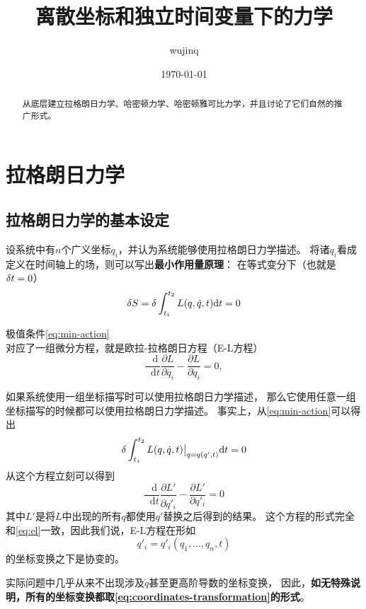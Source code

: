 \documentclass[UTF8, a4paper]{ctexart}
\title{离散坐标和独立时间变量下的力学}
\author{wujinq}
\date{\today}
\newcommand*{\diff}{\mathop{}\!\mathrm{d}}
\begin{document}
\maketitle

\begin{abstract}
    从底层建立拉格朗日力学、哈密顿力学、哈密顿雅可比力学，并且讨论了它们自然的推广形式。
\end{abstract}

\section{拉格朗日力学}

\subsection{拉格朗日力学的基本设定} \label{sec:langrangian-basic}
设系统中有$n$个广义坐标${q_i}$，并认为系统能够使用拉格朗日力学描述。
将诸$q_i$看成定义在时间轴上的场，则可以写出\textbf{最小作用量原理}：
在等式变分下（也就是$\var t=0$）
\begin{equation}
    \var S = \var \int_{t_1}^{t_2} L(q, \dot{q}, t) \mathrm{d} t = 0
    \label{eq:min-action}
\end{equation}

极值条件\eqref{eq:min-action}对应了一组微分方程，就是欧拉-拉格朗日方程（E-L方程）
\begin{equation}
    \frac{\diff}{\diff t} \frac{\partial L}{\partial \dot{q_i}} - \frac{\partial L}{\partial q_i} = 0,
    \label{eq:el}
\end{equation}

如果系统使用一组坐标描写时可以使用拉格朗日力学描述，
那么它使用任意一组坐标描写的时候都可以使用拉格朗日力学描述。
事实上，从\eqref{eq:min-action}可以得出
\[
    \var \int_{t_1}^{t_2} L(q, \dot{q}, t) \big |_{q=q(q', t)} \mathrm{d} t = 0
\]
从这个方程立刻可以得到
\[
    \frac{\diff}{\diff t} \frac{\partial L'}{\partial \dot{q'_i}} - \frac{\partial L'}{\partial q'_i} = 0
\]
其中$L'$是将$L$中出现的所有$q$都使用$q'$替换之后得到的结果。
这个方程的形式完全和\eqref{eq:el}一致，因此我们说，E-L方程在形如
\begin{equation}
    q'_i = q'_i(q_1, \ldots, q_n, t)
    \label{eq:coordinates-transformation}
\end{equation}
的坐标变换之下是协变的。

实际问题中几乎从来不出现涉及$\dot{q}$甚至更高阶导数的坐标变换，
因此，\textbf{如无特殊说明，所有的坐标变换都取\eqref{eq:coordinates-transformation}的形式}。
\end{document}
